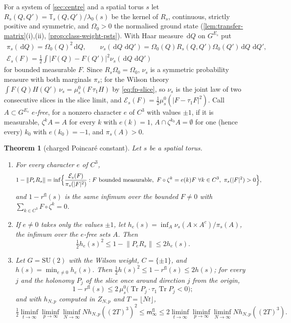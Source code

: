 \documentclass[11pt,a4paper]{amsart}
\newtheorem{theorem}{Theorem}[section]
\theoremstyle{definition}
\theoremstyle{remark}
\numberwithin{equation}{section}
\DeclareMathOperator{\Tr}{Tr}        %
\newcommand{\norm}[1]{\lVert #1\rVert}     %
\newcommand{\abs}[1]{\lvert #1\rvert}      %
\newcommand{\dd}{\,\mathrm{d}}             %
\newcommand{\SU}{\mathrm{SU}}              %
\newcommand{\TT}{\mathbb{T}}               %
\newcommand{\cube}[1]{(2#1)^3}             %
\newcommand{\lzero}{\lambda_0}             %
\newcommand{\Omegazero}{\Omega_0}          %
\begin{document}
For a system of \cref{sec:centre} and a spatial torus $s$ let $R_s(Q,Q')=\TT_s(Q,Q')/\lzero(s)$ be the kernel of $R_s$, continuous, strictly positive and symmetric, and $\Omegazero>0$ the normalised ground state (\cref{lem:transfer-matrix}\textup{(i),(ii)}, \cref{prop:class-weight-psts}). With Haar measure $\dd Q$ on $G^{E_s}$ put
\begin{gather*}
\pi_s(\dd Q)=\Omegazero(Q)^2\dd Q,\qquad \nu_s(\dd Q\,\dd Q')=\Omegazero(Q)R_s(Q,Q')\Omegazero(Q')\dd Q\,\dd Q',\\
\mathcal E_s(F)=\tfrac12\int\abs{F(Q)-F(Q')}^2\nu_s(\dd Q\,\dd Q')
\end{gather*}
for bounded measurable $F$. Since $R_s\Omegazero=\Omegazero$, $\nu_s$ is a symmetric probability measure with both marginals $\pi_s$; for the Wilson theory $\int F(Q)H(Q')\,\nu_s=\mu^0_s(F\,\tau_1H)$ by \eqref{eq:fp-slice}, so $\nu_s$ is the joint law of two consecutive slices in the slice limit, and $\mathcal E_s(F)=\frac12\mu^0_s(\abs{F-\tau_1F}^2)$. Call $A\subset G^{E_s}$ \emph{$e$-free}, for a nonzero character $e$ of $C^3$ with values $\pm1$, if it is measurable, $\zeta^kA=A$ for every $k$ with $e(k)=1$, $A\cap\zeta^{k_0}A=\emptyset$ for one (hence every) $k_0$ with $e(k_0)=-1$, and $\pi_s(A)>0$.

\begin{theorem}[charged Poincar\'e constant]\label{thm:charged-poincare}
Let $s$ be a spatial torus.
\begin{enumerate}[label=\textup{(\alph*)},leftmargin=*]
\item For every character $e$ of $C^3$,
\[
1-\norm{P_eR_s}=\inf\Bigl\{\frac{\mathcal E_s(F)}{\pi_s(\abs F^2)}:F\text{ bounded measurable},\ F\circ\zeta^k=e(k)F\ \forall k\in C^3,\ \pi_s(\abs F^2)>0\Bigr\},
\]
and $1-r^{\mathrm{fl}}(s)$ is the same infimum over the bounded $F\ne0$ with $\sum_{k\in C^3}F\circ\zeta^k=0$.
\item If $e\ne0$ takes only the values $\pm1$, let $h_e(s)=\inf_A\nu_s(A\times A^c)/\pi_s(A)$, the infimum over the $e$-free sets $A$. Then
\begin{equation}\label{eq:charged-cheeger}
\tfrac12h_e(s)^2\le1-\norm{P_eR_s}\le2h_e(s).
\end{equation}
\item Let $G=\SU(2)$ with the Wilson weight, $C=\{\pm1\}$, and $h(s)=\min_{e\ne0}h_e(s)$. Then $\frac12h(s)^2\le1-r^{\mathrm{fl}}(s)\le2h(s)$; for every $j$ and the holonomy $P_j$ of the slice once around direction $j$ from the origin,
\[
1-r^{\mathrm{fl}}(s)\le2\,\mu^0_s\bigl(\Tr P_j\cdot\tau_1\Tr P_j<0\bigr);
\]
and with $h_{N,p}$ computed in $Z_{N,p}$ and $T=\lfloor Nt\rfloor$,
\[
\tfrac12\liminf_{t\to\infty}\liminf_{p\to\infty}\liminf_{N\to\infty}Nh_{N,p}(\cube T)^2\le\mathsf m^{\mathrm{fl}}_\infty\le2\liminf_{t\to\infty}\liminf_{p\to\infty}\liminf_{N\to\infty}Nh_{N,p}(\cube T).
\]
\end{enumerate}
\end{theorem}
\end{document}

